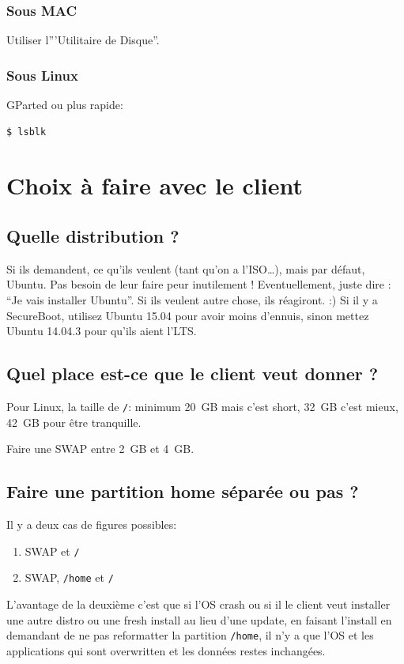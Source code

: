 \documentclass{../guide}
\begin{document}
\subsubsection{Sous MAC}
\todo[inline]Utiliser l'''Utilitaire de Disque''.
\subsubsection{Sous Linux}
GParted ou plus rapide:
\begin{verbatim}
$ lsblk
\end{verbatim}

\section{Choix à faire avec le client}

\subsection{Quelle distribution ?}
Si ils demandent, ce qu'ils veulent (tant qu'on a l'ISO…), mais par défaut, Ubuntu. Pas besoin de leur faire peur inutilement !
Eventuellement, juste dire : ``Je vais installer Ubuntu''. Si ils veulent autre chose, ils réagiront. :)
Si il y a SecureBoot, utilisez Ubuntu 15.04 pour avoir moins d'ennuis, sinon mettez Ubuntu 14.04.3 pour qu'ils aient l'LTS.

\subsection{Quel place est-ce que le client veut donner ?}
Pour Linux, la taille de \verb|/|: minimum \SI{20}{GB} mais c'est short, \SI{32}{GB} c'est mieux, \SI{42}{GB} pour être tranquille.

Faire une SWAP entre \SI{2}{GB} et \SI{4}{\giga B}.

\subsection{Faire une partition home séparée ou pas ?}
Il y a deux cas de figures possibles:
\begin{enumerate}
  \item SWAP et \verb|/|
  \item SWAP, \verb|/home| et \verb|/|
\end{enumerate}

L'avantage de la deuxième c'est que si l'OS crash ou si il le client veut installer une autre distro ou une fresh install au lieu d'une update, en faisant l'install en demandant de ne pas reformatter la partition \verb|/home|, il n'y a que l'OS et les applications qui sont overwritten et les données restes inchangées.
\end{document}
